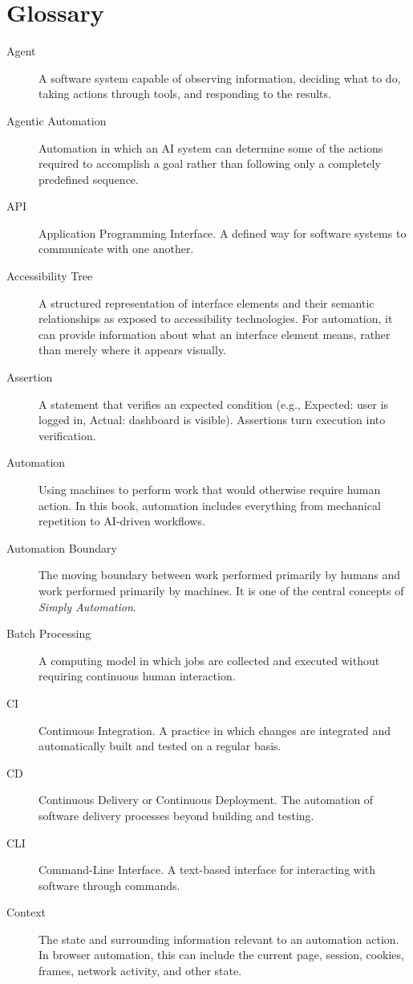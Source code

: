 \documentclass[11pt,twoside]{book}
\begin{document}
\chapter{Glossary}
\label{app:glossary}

\begin{description}
    \item[Agent] A software system capable of observing information, deciding what to do, taking actions through tools, and responding to the results.
    \item[Agentic Automation] Automation in which an AI system can determine some of the actions required to accomplish a goal rather than following only a completely predefined sequence.
    \item[API] Application Programming Interface. A defined way for software systems to communicate with one another.
    \item[Accessibility Tree] A structured representation of interface elements and their semantic relationships as exposed to accessibility technologies. For automation, it can provide information about what an interface element means, rather than merely where it appears visually.
    \item[Assertion] A statement that verifies an expected condition (e.g., Expected: user is logged in, Actual: dashboard is visible). Assertions turn execution into verification.
    \item[Automation] Using machines to perform work that would otherwise require human action. In this book, automation includes everything from mechanical repetition to AI-driven workflows.
    \item[Automation Boundary] The moving boundary between work performed primarily by humans and work performed primarily by machines. It is one of the central concepts of \textit{Simply Automation}.
    \item[Batch Processing] A computing model in which jobs are collected and executed without requiring continuous human interaction.
    \item[CI] Continuous Integration. A practice in which changes are integrated and automatically built and tested on a regular basis.
    \item[CD] Continuous Delivery or Continuous Deployment. The automation of software delivery processes beyond building and testing.
    \item[CLI] Command-Line Interface. A text-based interface for interacting with software through commands.
    \item[Context] The state and surrounding information relevant to an automation action. In browser automation, this can include the current page, session, cookies, frames, network activity, and other state.

\end{description}
\end{document}

